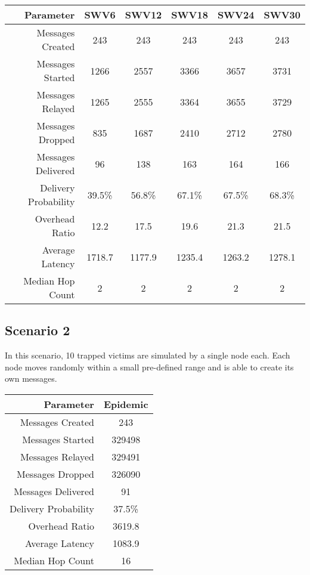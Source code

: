 \documentclass{article}
\begin{document}
\begin{center}
\begin{tabular}{|r|c|c|c|c|c|}
\hline
\textbf{Parameter} & \textbf{SWV6} & \textbf{SWV12} & \textbf{SWV18} & \textbf{SWV24} & \textbf{SWV30} \\ \hline
Messages Created & 243 & 243 & 243 & 243 & 243 \\ \hline
Messages Started & 1266 & 2557 & 3366 & 3657 & 3731 \\ \hline
Messages Relayed & 1265 & 2555 & 3364 & 3655 & 3729 \\ \hline
Messages Dropped & 835 & 1687 & 2410 & 2712 & 2780 \\ \hline
Messages Delivered & 96 & 138 & 163 & 164 & 166 \\ \hline
Delivery Probability & 39.5\% & 56.8\% & 67.1\% & 67.5\% & 68.3\%\\ \hline
Overhead Ratio & 12.2 & 17.5 & 19.6 & 21.3 & 21.5 \\ \hline
Average Latency & 1718.7 & 1177.9 & 1235.4 & 1263.2 & 1278.1 \\ \hline
Median Hop Count & 2 & 2 & 2 & 2 & 2\\ \hline
\end{tabular}
\end{center}

\subsection{Scenario 2}
In this scenario, 10 trapped victims are simulated by a single node each. Each node moves randomly within a small pre-defined range and is able to create its own messages.

\begin{center}
\begin{tabular}{|r|c|}
\hline
\textbf{Parameter} & \textbf{Epidemic} \\ \hline
Messages Created & 243 \\ \hline
Messages Started & 329498 \\ \hline
Messages Relayed & 329491 \\ \hline
Messages Dropped & 326090 \\ \hline
Messages Delivered & 91 \\ \hline
Delivery Probability & 37.5\%\\ \hline
Overhead Ratio & 3619.8 \\ \hline
Average Latency & 1083.9 \\ \hline
Median Hop Count & 16 \\ \hline
\end{tabular}
\end{center}
\end{document}

